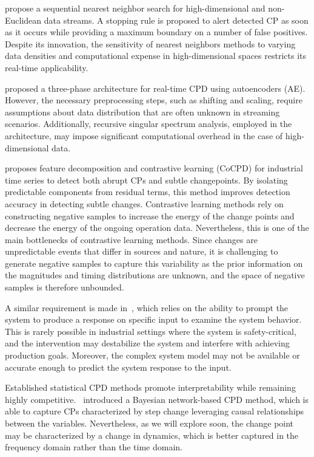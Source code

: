 \citet{Chu2022} propose a sequential nearest neighbor search for high-dimensional and non-Euclidean data streams. A stopping rule is proposed to alert detected CP as soon as it occurs while providing a maximum boundary on a number of false positives. Despite its innovation, the sensitivity of nearest neighbors methods to varying data densities and computational expense in high-dimensional spaces restricts its real-time applicability.

\citet{Gupta2022} proposed a three-phase architecture for real-time CPD using autoencoders (AE). However, the necessary preprocessing steps, such as shifting and scaling, require assumptions about data distribution that are often unknown in streaming scenarios. Additionally, recursive singular spectrum analysis, employed in the architecture, may impose significant computational overhead in the case of high-dimensional data.

\citet{Bao2024} proposes feature decomposition and contrastive learning (CoCPD) for industrial time series to detect both abrupt CPs and subtle changepoints. By isolating predictable components from residual terms, this method improves detection accuracy in detecting subtle changes. Contrastive learning methods rely on constructing negative samples to increase the energy of the change points and decrease the energy of the ongoing operation data. Nevertheless, this is one of the main bottlenecks of contrastive learning methods. Since changes are unpredictable events that differ in sources and nature, it is challenging to generate negative samples to capture this variability as the prior information on the magnitudes and timing distributions are unknown, and the space of negative samples is therefore unbounded.

A similar requirement is made in~\citet{Hayashi2019}, which relies on the ability to prompt the system to produce a response on specific input to examine the system behavior. This is rarely possible in industrial settings where the system is safety-critical, and the intervention may destabilize the system and interfere with achieving production goals. Moreover, the complex system model may not be available or accurate enough to predict the system response to the input.

Established statistical CPD methods promote interpretability while remaining highly competitive.~\citet{Rajaganapathy2022} introduced a Bayesian network-based CPD method, which is able to capture CPs characterized by step change leveraging causal relationships between the variables. Nevertheless, as we will explore soon, the change point may be characterized by a change in dynamics, which is better captured in the frequency domain rather than the time domain.


